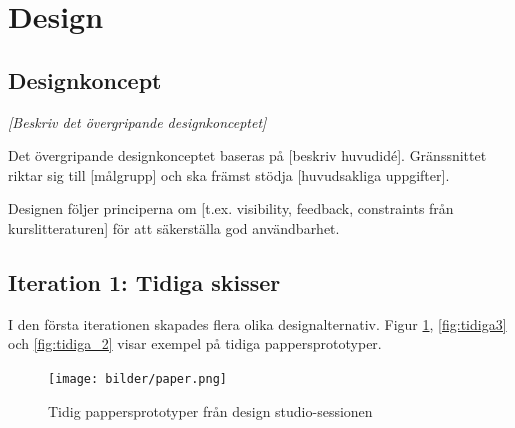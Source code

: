 \section{Design}

\subsection{Designkoncept}

\textit{[Beskriv det övergripande designkonceptet]}

Det övergripande designkonceptet baseras på [beskriv huvudidé]. Gränssnittet riktar sig till [målgrupp] och ska främst stödja [huvudsakliga uppgifter].

Designen följer principerna om [t.ex. visibility, feedback, constraints från kurslitteraturen] för att säkerställa god användbarhet.


\subsection{Iteration 1: Tidiga skisser}

I den första iterationen skapades flera olika designalternativ. Figur \ref{fig:tidiga_skisser}, \ref{fig:tidiga3} och \ref{fig:tidiga_2} visar exempel på tidiga pappersprototyper.

\begin{figure}[H]
    \centering
    \texttt{[image: bilder/paper.png]}
    \caption{Tidig pappersprototyper från design studio-sessionen}
    \label{fig:tidiga_skisser}
\end{figure}

